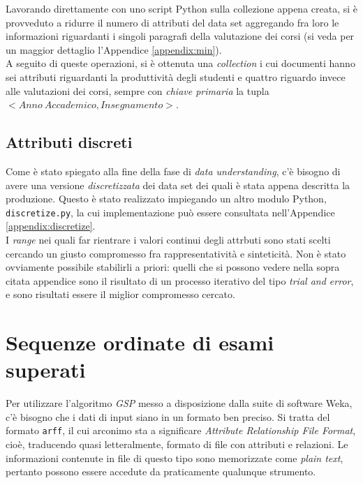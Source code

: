 		Lavorando direttamente con uno script Python sulla collezione appena creata, si è provveduto a ridurre il numero di attributi del data set aggregando fra loro le informazioni riguardanti i singoli paragrafi della valutazione dei corsi (si veda per un maggior dettaglio l'Appendice \ref{appendix:min}). \\

		A seguito di queste operazioni, si è ottenuta una \textit{collection} i cui documenti hanno sei attributi riguardanti la produttività degli studenti e quattro riguardo invece alle valutazioni dei corsi, sempre con \textit{chiave primaria} la tupla $< Anno \ Accademico, Insegnamento >$.
	
	\subsection{Attributi discreti}

		Come è stato spiegato alla fine della fase di \textit{data understanding}, c'è bisogno di avere una versione \textit{discretizzata} dei data set dei quali è stata appena descritta la produzione. Questo è stato realizzato impiegando un altro modulo Python, \texttt{discretize.py}, la cui implementazione può essere consultata nell'Appendice \ref{appendix:discretize}. \\

		I \textit{range} nei quali far rientrare i valori continui degli attrbuti sono stati scelti cercando un giusto compromesso fra rappresentatività e sinteticità. Non è stato ovviamente possibile stabilirli a priori: quelli che si possono vedere nella sopra citata appendice sono il risultato di un processo iterativo del tipo \textit{trial and error}, e sono risultati essere il miglior compromesso cercato.

\section{Sequenze ordinate di esami superati}
\label{prepr:seq}

	Per utilizzare l'algoritmo \textit{GSP} messo a disposizione dalla suite di software Weka, c'è bisogno che i dati di input siano in un formato ben preciso. Si tratta del formato \texttt{arff}, il cui arconimo sta a significare \textit{Attribute Relationship File Format}, cioè, traducendo quasi letteralmente, formato di file con attributi e relazioni. Le informazioni contenute in file di questo tipo sono memorizzate come \textit{plain text}, pertanto possono essere accedute da praticamente qualunque strumento.\\

